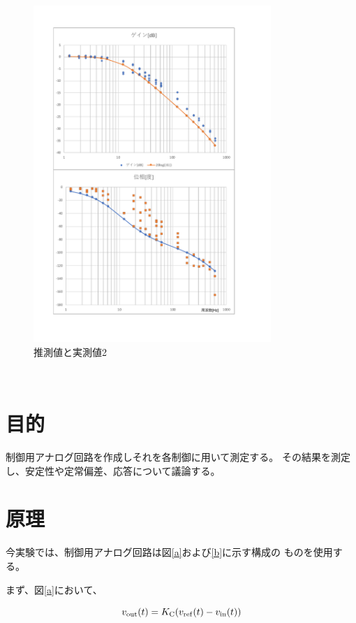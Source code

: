 \documentclass[uplatex, 11pt,a4j, titlepage]{jsarticle}
\begin{document}
\begin{figure}[h]
    \centering
    \includegraphics[width=9cm]{ideal_real2.pdf}
    \caption{推測値と実測値2}
    \label{ideal_real}
\end{figure}


\newpage
\newpage
\ 
\newpage
\ 
\newpage



\section{目的}
制御用アナログ回路を作成しそれを各制御に用いて測定する。
その結果を測定し、安定性や定常偏差、応答について議論する。

\section{原理}
今実験では、制御用アナログ回路は図\ref{a}および\ref{b}に示す構成の
ものを使用する。

まず、図\ref{a}において、

\begin{equation}\label{twenty_seven}
    v_{\rm out}(t) = K_{\rm C}(v_{\rm ref}(t) - v_{\rm in}(t))
\end{equation}
\end{document}
